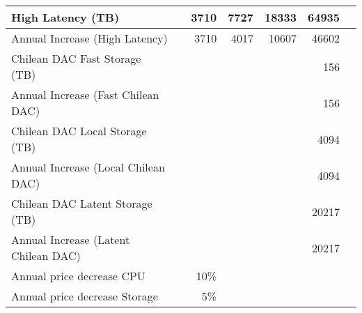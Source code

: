 \begin{longtable} { |p{}  |r  |r  |r  |r  |r  |r |}
{High Latency (TB)}&{}&{3710}&{7727}&{18333}&{64935} \\ \hline
{Annual Increase (High Latency)}&{}&{3710}&{4017}&{10607}&{46602} \\ \hline
{Chilean DAC Fast Storage (TB)}&{}&{}&{}&{}&{156} \\ \hline
{Annual Increase (Fast Chilean DAC)}&{}&{}&{}&{}&{156} \\ \hline
{Chilean DAC Local Storage (TB)}&{}&{}&{}&{}&{4094} \\ \hline
{Annual Increase (Local Chilean DAC)}&{}&{}&{}&{}&{4094} \\ \hline
{Chilean DAC Latent Storage (TB)}&{}&{}&{}&{}&{20217} \\ \hline
{Annual Increase (Latent Chilean DAC)}&{}&{}&{}&{}&{20217} \\ \hline
{Annual price decrease CPU}&{}&{10\%}&&& \\ \hline
{Annual price decrease Storage}&{}&{5\%}&&& \\ \hline
\end{longtable} \normalsize
